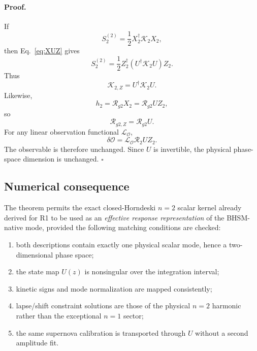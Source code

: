 \paragraph{Proof.}
If
\begin{equation}
S_2^{(2)}
=
\frac12 X_2^\dagger\mathcal K_2X_2,
\end{equation}
then Eq.~\eqref{eq:XUZ} gives
\begin{equation}
S_2^{(2)}
=
\frac12
Z_2^\dagger
\left(
U^\dagger\mathcal K_2U
\right)
Z_2.
\end{equation}
Thus
\begin{equation}
\mathcal K_{2,Z}
=
U^\dagger\mathcal K_2U.
\end{equation}
Likewise,
\begin{equation}
h_2
=
\mathcal R_{g2}X_2
=
\mathcal R_{g2}UZ_2,
\end{equation}
so
\begin{equation}
\mathcal R_{g2,Z}
=
\mathcal R_{g2}U.
\end{equation}
For any linear observation functional
$\mathcal L_{\mathcal O}$,
\begin{equation}
\delta\mathcal O
=
\mathcal L_{\mathcal O}\mathcal R_{2}UZ_2.
\end{equation}
The observable is therefore unchanged.  Since $U$ is invertible, the physical
phase-space dimension is unchanged. \hfill$\square$

\subsection{Numerical consequence}

The theorem permits the exact closed-Horndeski $n=2$ scalar kernel already
derived for R1 to be used as an \emph{effective response representation} of
the BHSM-native mode, provided the following matching conditions are checked:

\begin{enumerate}
\item both descriptions contain exactly one physical scalar mode, hence a
      two-dimensional phase space;
\item the state map $U(z)$ is nonsingular over the integration interval;
\item kinetic signs and mode normalization are mapped consistently;
\item lapse/shift constraint solutions are those of the physical $n=2$
      harmonic rather than the exceptional $n=1$ sector;
\item the same supernova calibration is transported through $U$ without a
      second amplitude fit.
\end{enumerate}

